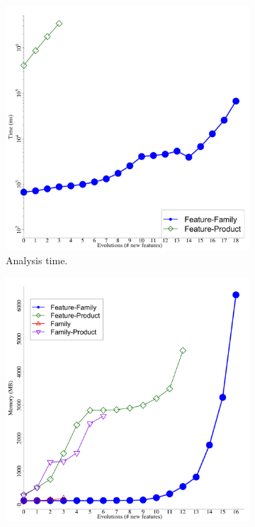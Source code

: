 \begin{figure}[p]
  \begin{subfigure}[t]{0.5\columnwidth}
    \centering
    \includegraphics[width=1.0\columnwidth]{img/logintercloudTime}
    \caption{Analysis time.}
    \label{fig:intercloud-analysisTime}
  \end{subfigure}
  \begin{subfigure}[t]{0.5\columnwidth}
    \centering
    \includegraphics[width=1.0\columnwidth]{img/intercloudSpace}

\end{subfigure}
\end{figure}
